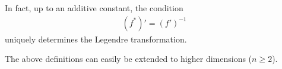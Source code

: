     \begin{property}\label{calculus:legendre_condition}
        In fact, up to an additive constant, the condition
        \begin{gather}
            (f^*)' = (f')^{-1}
        \end{gather}
        uniquely determines the Legendre transformation.
    \end{property}
    \begin{remark}
        The above definitions can easily be extended to higher dimensions ($n\geq2$).
    \end{remark}